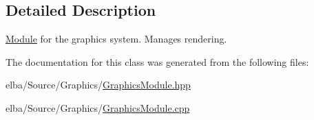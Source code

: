 \subsection{Detailed Description}
\mbox{\hyperlink{class_e_l_b_a_1_1_module}{Module}} for the graphics system. Manages rendering. 

The documentation for this class was generated from the following files\+:\begin{DoxyCompactItemize}
\item 
elba/\+Source/\+Graphics/\mbox{\hyperlink{_graphics_module_8hpp}{Graphics\+Module.\+hpp}}\item 
elba/\+Source/\+Graphics/\mbox{\hyperlink{_graphics_module_8cpp}{Graphics\+Module.\+cpp}}\end{DoxyCompactItemize}

